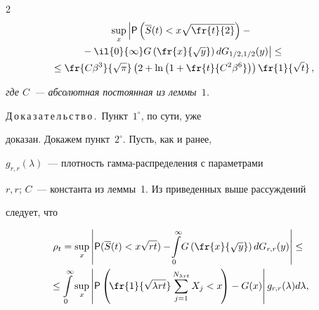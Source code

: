 \begin{multicols}{2}
\begin{multline*}
\sup\limits_x\left\vert{\sf


P}\left(\overline


S(t)<x\sqrt{\fr{t}{2}}\right)-{}\right.\\


\left.{}-\il{0}{\infty}G\left(\fr{x}{\sqrt{y}}\right)


dG_{1/2,1/2}(y)\right\vert\le{}\\


{}\le


\fr{C\beta^3}{\sqrt{\pi}}


\left(2+\ln\left(1+\fr{t}{C^2\beta^6}\right)\right)\fr{1}{\sqrt{t}}\,,


\end{multline*}


\textit{где $C$~--- абсолютная постоянная из леммы~$1$.}





\smallskip





\noindent


Д\,о\,к\,а\,з\,а\,т\,е\,л\,ь\,с\,т\,в\,о\,.~Пункт~$1^{\circ}$, по сути, уже


доказан. Докажем пункт~$2^{\circ}$. Пусть, как и ранее,


$g_{r,r}(\lambda)$~--- плотность гам\-ма-рас\-пре\-де\-ле\-ния с параметрами


$r,r$; $C$~--- константа из леммы~1. Из приведенных выше рассуждений


следует, что


\begin{multline*}


\hspace*{-6pt}\rho_t=\sup\limits_x\left\vert{\sf P}(\overline


S(t)<x\sqrt{rt})-\!\int\limits_{0}^{\infty}\!


G\left(\fr{x}{\sqrt{y}}\right)dG_{r,r}(y)\right\vert\le{}


\\


\hspace*{-6pt}{}\le \int\limits_0^{\infty}\sup\limits_x \left\vert{\sf


P}\left(\!\fr{1}{\sqrt{\lambda rt}}\sum\limits_{j=1}^{N_{\lambda rt}}X_j<x


\!\right)-G(x)\right\vert g_{r,r}(\lambda)d\lambda,


\end{multline*}



\end{multicols}
